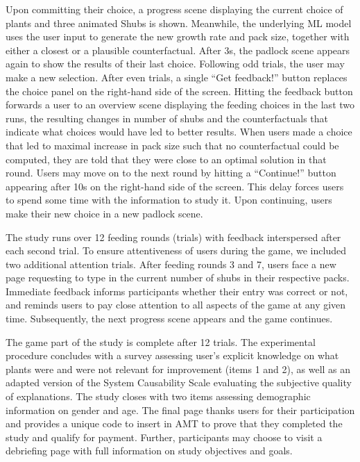 {Upon committing their choice, a progress scene displaying the current choice of plants and three animated Shubs is shown. 
Meanwhile, the underlying \gls{ML} model uses the user input to generate the new growth rate and pack size, together with either a closest or a plausible counterfactual.
After 3s, the padlock scene appears again to show the results of their last choice. 
Following odd trials, the user may make a new selection. 
After even trials, a single ``Get feedback!'' button replaces the choice panel on the right-hand side of the screen.
Hitting the feedback button forwards a user to an overview scene displaying the feeding choices in the last two runs, the resulting changes in number of shubs and the counterfactuals that indicate what choices would have led to better results. 
When users made a choice that led to maximal increase in pack size such that no counterfactual could be computed, they are told that they were close to an optimal solution in that round. 
Users may move on to the next round by hitting a ``Continue!'' button appearing after 10s on the right-hand side of the screen. This delay forces users to spend some time with the information to study it. Upon continuing, users make their new choice in a new padlock scene.

The study runs over 12 feeding rounds (trials) with feedback interspersed after each second trial. 
To ensure attentiveness of users during the game, we included two additional attention trials.
After feeding rounds 3 and 7, users face a new page requesting to type in the current number of shubs in their respective packs.
Immediate feedback informs participants whether their entry was correct or not, and reminds users to pay close attention to all aspects of the game at any given time.
Subsequently, the next progress scene appears and the game continues. 

The game part of the study is complete after 12 trials.
The experimental procedure concludes with a survey assessing user's explicit knowledge on what plants were and were not relevant for improvement (items 1 and 2), as well as an adapted version of the System Causability Scale \cite{holzinger_measuring_2020} evaluating the subjective quality of explanations.
The study closes with two items assessing demographic information on gender and age.
The final page thanks users for their participation and provides a unique code to insert in \gls{AMT} to prove that they completed the study and qualify for payment. 
Further, participants may choose to visit a debriefing page with full information on study objectives and goals. 

}
